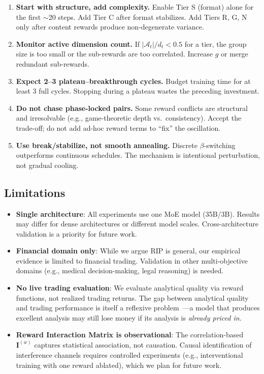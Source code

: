 \documentclass[sigconf]{acmart}
\begin{document}
\begin{enumerate}
    \item \textbf{Start with structure, add complexity.} Enable Tier S (format) alone for the first $\sim$20 steps. Add Tier C after format stabilizes. Add Tiers R, G, N only after content rewards produce non-degenerate variance.
    
    \item \textbf{Monitor active dimension count.} If $|\mathcal{A}_t| / d_t < 0.5$ for a tier, the group size is too small or the sub-rewards are too correlated. Increase $g$ or merge redundant sub-rewards.
    
    \item \textbf{Expect 2--3 plateau--breakthrough cycles.} Budget training time for at least 3 full cycles. Stopping during a plateau wastes the preceding investment.
    
    \item \textbf{Do not chase phase-locked pairs.} Some reward conflicts are structural and irresolvable (e.g., game-theoretic depth vs.\ consistency). Accept the trade-off; do not add ad-hoc reward terms to ``fix'' the oscillation.
    
    \item \textbf{Use break/stabilize, not smooth annealing.} Discrete $\beta$-switching outperforms continuous schedules. The mechanism is intentional perturbation, not gradual cooling.
\end{enumerate}

\subsection{Limitations}

\begin{itemize}
    \item \textbf{Single architecture}: All experiments use one MoE model (35B/3B). Results may differ for dense architectures or different model scales. Cross-architecture validation is a priority for future work.
    
    \item \textbf{Financial domain only}: While we argue RIP is general, our empirical evidence is limited to financial trading. Validation in other multi-objective domains (e.g., medical decision-making, legal reasoning) is needed.
    
    \item \textbf{No live trading evaluation}: We evaluate analytical quality via reward functions, not realized trading returns. The gap between analytical quality and trading performance is itself a reflexive problem~\cite{anon2026reflexive}---a model that produces excellent analysis may still lose money if its analysis is \textit{already priced in}.
    
    \item \textbf{Reward Interaction Matrix is observational}: The correlation-based $\mathbf{I}^{(w)}$ captures statistical association, not causation. Causal identification of interference channels requires controlled experiments (e.g., interventional training with one reward ablated), which we plan for future work.
\end{itemize}
\end{document}
